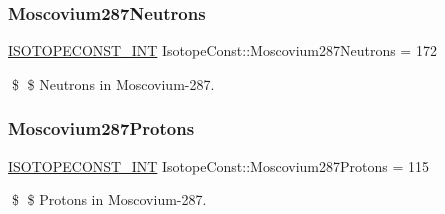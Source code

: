 \subsubsection{\texorpdfstring{Moscovium287\+Neutrons}{Moscovium287Neutrons}}
{\footnotesize\ttfamily \mbox{\hyperlink{group___isotope_const-_macros_ga5f18360b3e99483a35c32d789e62621c}{I\+S\+O\+T\+O\+P\+E\+C\+O\+N\+S\+T\+\_\+\+I\+NT}} Isotope\+Const\+::\+Moscovium287\+Neutrons = 172}

\$ \$ Neutrons in Moscovium-\/287. \mbox{\label{group___isotope_const-_moscovium-_mc287_gaf95e8567dd1a1bcd9d3080196a0b6900}} 
\subsubsection{\texorpdfstring{Moscovium287\+Protons}{Moscovium287Protons}}
{\footnotesize\ttfamily \mbox{\hyperlink{group___isotope_const-_macros_ga5f18360b3e99483a35c32d789e62621c}{I\+S\+O\+T\+O\+P\+E\+C\+O\+N\+S\+T\+\_\+\+I\+NT}} Isotope\+Const\+::\+Moscovium287\+Protons = 115}

\$ \$ Protons in Moscovium-\/287. 